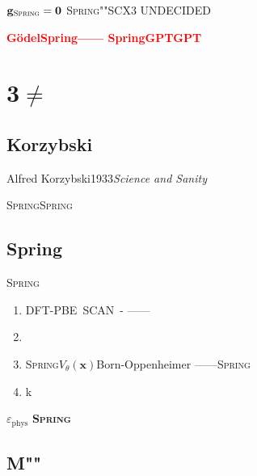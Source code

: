 \documentclass[12pt,a4paper]{article}
\theoremstyle{remark}
\newcommand{\Spring}{\textsc{Spring}}
\newcommand{\honestcrit}[1]{%
    \textcolor{red}{\textbf{#1}}%
}
\begin{document}
$\mathbf{g}_{\Spring} = \mathbf{0}$
\Spring{}""SCX3
\textsc{UNDECIDED}

\honestcrit{G\"odelSpring——
SpringGPTGPT}

\newpage

\section{3$\neq$}

\subsection{Korzybski}

Alfred Korzybski1933\textit{Science and Sanity}~\cite{korzybski1933}

\begin{center}
\boxed{\text{}}
\end{center}





\Spring{}\Spring{}
\textbf{}

\subsection{Spring}

\Spring{}

\begin{enumerate}[label=\textbf{ \arabic*}, leftmargin=*, itemsep=5pt]
    \item \textbf{}
    DFT-PBE~\cite{perdew1996}SCAN~\cite{sun2015}-
    ——
    
    \item \textbf{}
    
    
    
    \item \textbf{}
    \Spring{}$V_\theta(\mathbf{x})$Born-Oppenheimer
    ——\Spring{}
    
    \item \textbf{}
    k
\end{enumerate}

$\varepsilon_{\text{phys}}$
\textbf{\Spring{}}

\subsection{M""}
\end{document}
